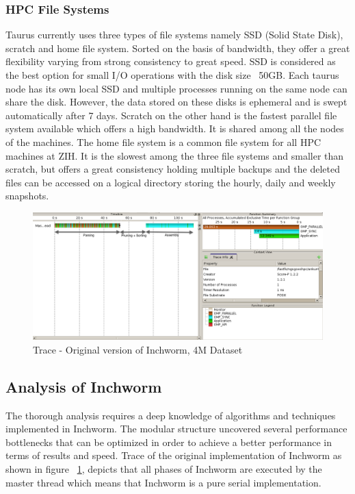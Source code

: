 \label{key}\documentclass[plainarticle, english ,zihtitle,final,hyperref,utf8]{zihpub}
\begin{document}
\subsubsection{HPC File Systems}
Taurus currently uses three types of file systems namely SSD (Solid State Disk), scratch and home file system. Sorted on the basis of bandwidth, they offer a great flexibility varying from strong consistency to great speed. SSD is considered as the best option for small I/O operations with the disk size ~50GB. Each taurus node has its own local SSD and multiple processes running on the same node can share the disk. However, the data stored on these disks is ephemeral and is swept automatically after 7 days. Scratch on the other hand is the fastest parallel file system available which offers a high bandwidth. It is shared among all the nodes of the machines. The home file system is a common file system for all HPC machines at ZIH. It is the slowest among the three file systems and smaller than scratch, but offers a great consistency holding multiple backups and the deleted files can be accessed on a logical directory storing the hourly, daily and weekly snapshots.
\begin{figure}[h]
\center
\includegraphics[scale=0.35]{trace-original}
\caption{Trace - Original version of Inchworm, 4M Dataset}
\label{trace-original}
\end{figure}
\subsection{Analysis of Inchworm}
The thorough analysis requires a deep knowledge of algorithms and techniques implemented in Inchworm. The modular structure uncovered several performance bottlenecks that can be optimized in order to achieve a better performance in terms of results and speed. Trace of the original implementation of Inchworm as shown in figure ~\ref{trace-original}, depicts that all phases of Inchworm are executed by the master thread which means that Inchworm is a pure serial implementation.
\end{document}
